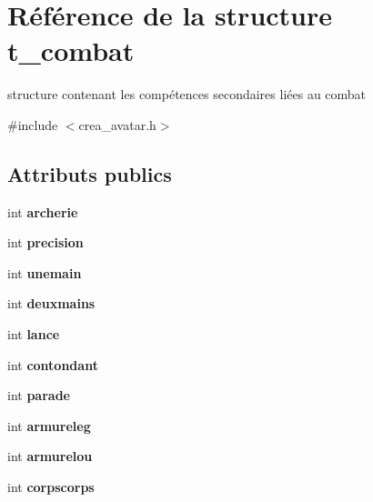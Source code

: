 \hypertarget{structt__combat}{\section{Référence de la structure t\-\_\-combat}
\label{structt__combat}
}


structure contenant les compétences secondaires liées au combat  




{\ttfamily \#include $<$crea\-\_\-avatar.\-h$>$}

\subsection*{Attributs publics}
\begin{DoxyCompactItemize}
\item 
\hypertarget{structt__combat_a99dd7e1f55e0d7790b81b1bdb80be344}{int {\bfseries archerie}}\label{structt__combat_a99dd7e1f55e0d7790b81b1bdb80be344}

\item 
\hypertarget{structt__combat_a2a3be008fc6e1241915c387f733d7eef}{int {\bfseries precision}}\label{structt__combat_a2a3be008fc6e1241915c387f733d7eef}

\item 
\hypertarget{structt__combat_a0d5894f8d70c742279cdf0d178a809f9}{int {\bfseries unemain}}\label{structt__combat_a0d5894f8d70c742279cdf0d178a809f9}

\item 
\hypertarget{structt__combat_adc0c9d1db812e1c84c16c7d80461a826}{int {\bfseries deuxmains}}\label{structt__combat_adc0c9d1db812e1c84c16c7d80461a826}

\item 
\hypertarget{structt__combat_a7980b6e41f8150c08451d2d4ab981427}{int {\bfseries lance}}\label{structt__combat_a7980b6e41f8150c08451d2d4ab981427}

\item 
\hypertarget{structt__combat_ac7cf5d794988f322f2771907b4047583}{int {\bfseries contondant}}\label{structt__combat_ac7cf5d794988f322f2771907b4047583}

\item 
\hypertarget{structt__combat_a8e7a076858bf0b1f23ad54e7cf1c690a}{int {\bfseries parade}}\label{structt__combat_a8e7a076858bf0b1f23ad54e7cf1c690a}

\item 
\hypertarget{structt__combat_a3d54627be0914faeda4f4fa3fa729bb5}{int {\bfseries armureleg}}\label{structt__combat_a3d54627be0914faeda4f4fa3fa729bb5}

\item 
\hypertarget{structt__combat_aecc5ab8a64a744c96aeae123ff9dbc5b}{int {\bfseries armurelou}}\label{structt__combat_aecc5ab8a64a744c96aeae123ff9dbc5b}

\item 
\hypertarget{structt__combat_a79a14923e9874375bef6704cd687e3e0}{int {\bfseries corpscorps}}\label{structt__combat_a79a14923e9874375bef6704cd687e3e0}

\end{DoxyCompactItemize}


